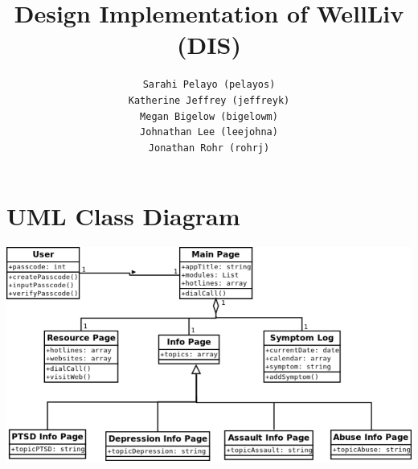 \documentclass[letterpaper,12pt,titlepage]{article}
\title{Design Implementation of WellLiv (DIS)}
\author{
  \texttt{Sarahi Pelayo (pelayos)}
  \\[.5ex]
  \texttt{Katherine Jeffrey (jeffreyk)}
  \\[.5ex]
  \texttt{Megan Bigelow (bigelowm)}
  \\[.5ex]
  \texttt{Johnathan Lee (leejohna)}
  \\[.5ex]
  \texttt{Jonathan Rohr (rohrj)}
}
\begin{document}
\maketitle
\section{UML Class Diagram}
\vspace{50pt}
\hspace*{-1in}
\includegraphics[scale=.55]{UML_Diagram}~\cite{umldia}

\newpage
\end{document}
